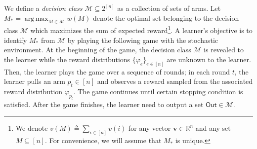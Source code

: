 \documentclass{article}
\newcommand{\Rew}{\varphi}
\newcommand{\E}{\mathbb E}
\newcommand{\M}{\mathcal M}
\newcommand{\RR}{\mathbb R}
\DeclareMathOperator*{\argmax}{arg\,max}
\newcommand{\out}{\mathsf{Out}}
\renewcommand{\vec}[1]{\boldsymbol{#1}}
\begin{document}
We define a \emph{decision class} $\M \subseteq 2^{[n]}$ as a   collection of sets of arms.
Let $M_*=\argmax_{M\in \M} w(M)$ denote the optimal set belonging to the decision class $\M$ which maximizes the sum of expected reward\footnote{We denote $v(M)\triangleq \sum_{i\in[n]} v(i)$ for any vector $\vec v\in\RR^{n}$ and any set $M\subseteq[n]$. For convenience, we will assume that $M_*$ is unique.}. 
A learner's objective is to identify $M_*$ from $\M$ by playing the following game with the stochastic environment.
At the beginning of the game, the decision class $\M$ is revealed to the learner while the reward distributions $\{\Rew_e\}_{e\in[n]}$ are unknown to the learner.
Then, the learner plays the game over a sequence of rounds;
in each round $t$, the learner pulls an arm $p_t\in [n]$ and observes a reward sampled from the associated reward distribution $\Rew_{p_t}$.
The game continues until certain stopping condition is satisfied.
After the game finishes, the learner need to output a set $\out \in \M$.



\end{document}
